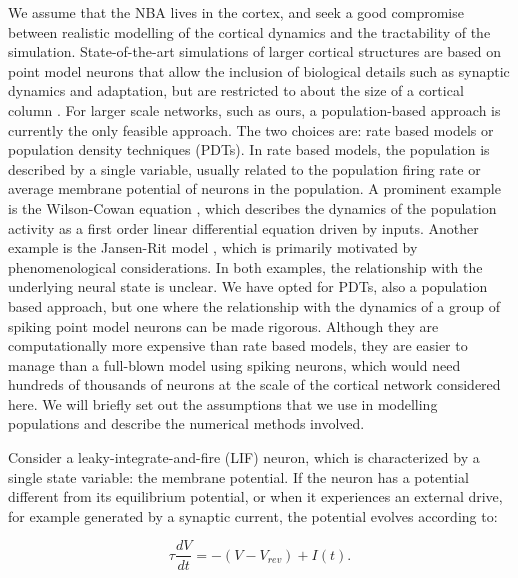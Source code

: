 \documentclass[10pt]{article}
\begin{document}
We assume that the NBA lives in the cortex, and seek a good compromise between realistic modelling of the cortical dynamics and the tractability of the simulation.
State-of-the-art simulations of larger cortical structures are based on point model neurons that allow the inclusion of biological details such as synaptic dynamics and adaptation, but are restricted to about the size of a cortical column \cite{potjans2014}.
For larger scale networks, such as ours, a population-based approach is currently the only feasible approach.
The two choices are: rate based models or population density techniques (PDTs).
In rate based models, the population is described by a single variable, usually related to the population firing rate or average membrane potential of neurons in the population. 
A prominent example is the  Wilson-Cowan equation \cite{wilson1972excitatory}, which describes the dynamics of the population activity as a first order linear differential equation driven by inputs.
Another example is the Jansen-Rit model \cite{jansen1995electroencephalogram}, which is primarily motivated by phenomenological considerations.
In both examples, the relationship with the underlying neural state is unclear. We have opted for PDTs, also a population based approach, but one where the relationship with the dynamics of a group of spiking point model neurons can be made rigorous.
Although they are computationally more expensive than rate based models, they are easier to manage than a full-blown model using spiking neurons, which would need hundreds of thousands of neurons at the scale of the cortical network considered here.
We will briefly set out the assumptions that we use in modelling populations and describe the numerical methods involved.

Consider a leaky-integrate-and-fire (LIF) neuron, which is characterized by a single state variable: the membrane potential.
If the neuron has a potential different from its equilibrium potential, or when it experiences an external drive, for example generated by a synaptic current, the potential evolves according to:

\begin{equation}
\tau \frac{dV}{dt} = -(V - V_{rev}) + I(t).
\label{eq-lif}
\end{equation}
\end{document}
